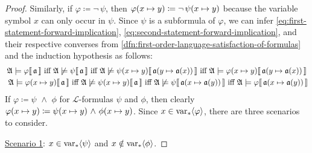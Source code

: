 \begin{proof}
    \vspace{0.1cm}
    \noindent
    Similarly, if \( \varphi \coloneq \lnot \, \psi \), then \( \folfreevariablereplacement{\varphi}{x}{y} \coloneq \lnot \, \folfreevariablereplacement{\psi}{x}{y} \)
    because the variable symbol \( x \) can only occur in \( \psi \).
    Since \( \psi \) is a subformula of \( \varphi \),
    we can infer \eqref{eq:first-statement-forward-implication}, \eqref{eq:second-statement-forward-implication}, and their respective converses
    from \cref{dfn:first-order-language-satisfaction-of-formulas} and the induction hypothesis as follows:
    \begin{gather*}
        \folwffsatisfaction{\mathfrak{A}}{\varphi}{\mathfrak{a}} \ \text{iff} \ \folwffnonsatisfaction{\mathfrak{A}}{\psi}{\mathfrak{a}}
        \ \text{iff} \ \folwffnonsatisfaction{\mathfrak{A}}{ \folfreevariablereplacement{\psi}{x}{y} }{ \folmodifiedvariableassignmentfunction{\mathfrak{a}}{y}{\mathfrak{a}(x)} }
        \ \text{iff} \ \folwffsatisfaction{\mathfrak{A}}{ \folfreevariablereplacement{\varphi}{x}{y} }{ \folmodifiedvariableassignmentfunction{\mathfrak{a}}{y}{\mathfrak{a}(x)} }\\
        \ \folwffsatisfaction{\mathfrak{A}}{ \folfreevariablereplacement{\varphi}{x}{y} }{\mathfrak{a}}
        \ \text{iff} \ \folwffnonsatisfaction{\mathfrak{A}}{ \folfreevariablereplacement{\psi}{x}{y} }{\mathfrak{a}}
        \ \text{iff} \ \folwffnonsatisfaction{\mathfrak{A}}{\psi}{ \folmodifiedvariableassignmentfunction{\mathfrak{a}}{x}{\mathfrak{a}(y)} }
        \ \text{iff} \ \folwffsatisfaction{\mathfrak{A}}{\varphi}{ \folmodifiedvariableassignmentfunction{\mathfrak{a}}{x}{\mathfrak{a}(y)} }
    \end{gather*}
    If \( \varphi \coloneq \psi \,\,{\land}\,\, \phi \) for \( \mathcal{L} \)-formulas \( \psi \) and \( \phi \),
    then clearly \( \folfreevariablereplacement{\varphi}{x}{y} \coloneq \folfreevariablereplacement{\psi}{x}{y} \,\,{\land}\,\, \folfreevariablereplacement{\phi}{x}{y} \).
    Since \( x \in \operatorname{var}_{\ast} \langle\varphi\rangle \), there are three scenarios to consider.

    \vspace{0.3cm}
    \noindent
    \underline{Scenario 1}: \( x \in \operatorname{var}_{\ast} \langle\psi\rangle \) and \( x \notin \operatorname{var}_{\ast} \langle\phi\rangle \).


\end{proof}
